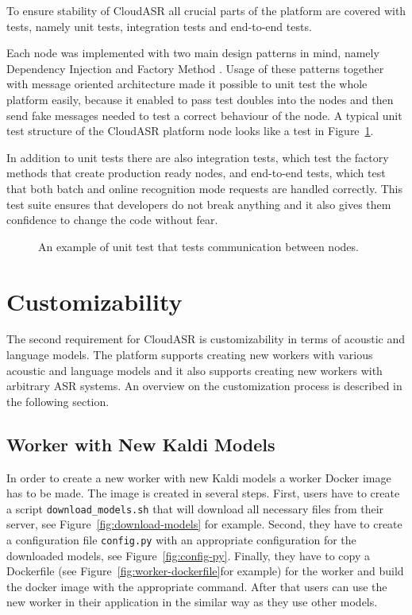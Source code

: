 To ensure stability of CloudASR all crucial parts of the platform are covered with tests,
  namely unit tests, integration tests and end-to-end tests.

Each node was implemented with two main design patterns in mind, namely Dependency Injection \cite{fowler2004inversion} and Factory Method \cite{gamma1993design}.
Usage of these patterns together with message oriented architecture made it possible to unit test the whole platform easily,
  because it enabled to pass test doubles into the nodes
  and then send fake messages needed to test a correct behaviour of the node.
A typical unit test structure of the CloudASR platform node looks like a test in Figure~\ref{fig:unit-test}.

In addition to unit tests there are also integration tests,
  which test the factory methods that create production ready nodes,
  and end-to-end tests,
  which test that both batch and online recognition mode requests are handled correctly.
This test suite ensures that developers do not break anything
  and it also gives them confidence to change the code without fear.

\begin{figure}[h]
  

  \caption{An example of unit test that tests communication between nodes.}
  \label{fig:unit-test}
\end{figure}


\section{Customizability}
The second requirement for CloudASR is customizability in terms of acoustic and language models.
The platform supports creating new workers with various acoustic and language models and
  it also supports creating new workers with arbitrary ASR systems.
An overview on the customization process is described in the following section.


\subsection{Worker with New Kaldi Models}
In order to create a new worker with new Kaldi models a worker Docker image has to be made.
The image is created in several steps.
First, users have to create a script \texttt{download\_models.sh}
  that will download all necessary files from their server,
  see Figure~\ref{fig:download-models} for example.
Second, they have to create a configuration file \texttt{config.py} with an appropriate configuration for the downloaded models,
  see Figure~\ref{fig:config-py}.
Finally, they have to copy a Dockerfile (see Figure~\ref{fig:worker-dockerfile}for example) for the worker
  and build the docker image with the appropriate command.
After that users can use the new worker in their application in the similar way as they use other models.


